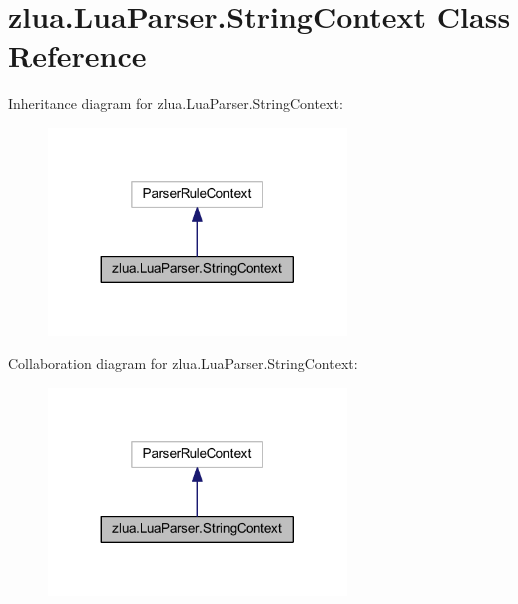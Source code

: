 \hypertarget{classzlua_1_1_lua_parser_1_1_string_context}{}\section{zlua.\+Lua\+Parser.\+String\+Context Class Reference}
\label{classzlua_1_1_lua_parser_1_1_string_context}


Inheritance diagram for zlua.\+Lua\+Parser.\+String\+Context\+:
\nopagebreak
\begin{figure}[H]
\begin{center}
\leavevmode
\includegraphics[width=224pt]{classzlua_1_1_lua_parser_1_1_string_context__inherit__graph}
\end{center}
\end{figure}


Collaboration diagram for zlua.\+Lua\+Parser.\+String\+Context\+:
\nopagebreak
\begin{figure}[H]
\begin{center}
\leavevmode
\includegraphics[width=224pt]{classzlua_1_1_lua_parser_1_1_string_context__coll__graph}
\end{center}
\end{figure}
